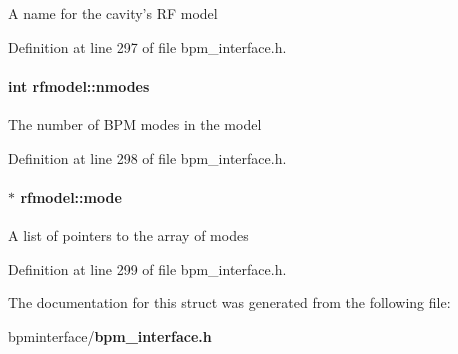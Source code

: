 A name for the cavity's RF model 

Definition at line 297 of file bpm\_\-interface.h.
\paragraph[nmodes]{\setlength{\rightskip}{0pt plus 5cm}int {\bf rfmodel::nmodes}}\hfill\label{structrfmodel_d540be1e4090f1a5f0473ef98924422d}


The number of BPM modes in the model 

Definition at line 298 of file bpm\_\-interface.h.
\paragraph[mode]{$\ast$ {\bf rfmodel::mode}}\hfill\label{structrfmodel_b4dbc2c56b212e42858185090cfdd0ac}


A list of pointers to the array of modes 

Definition at line 299 of file bpm\_\-interface.h.

The documentation for this struct was generated from the following file:\begin{CompactItemize}
\item 
bpminterface/{\bf bpm\_\-interface.h}\end{CompactItemize}
